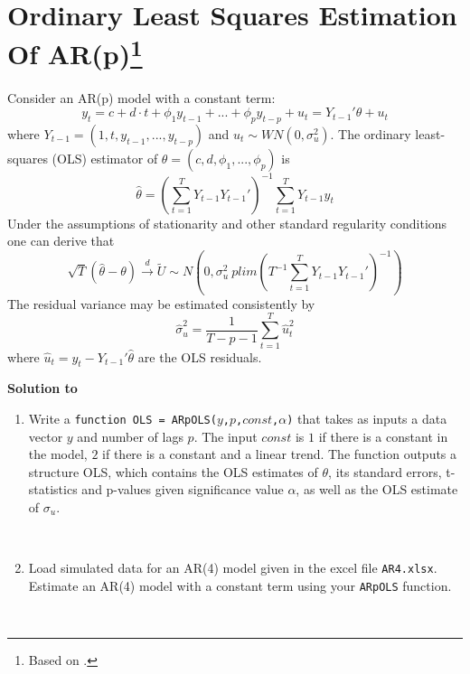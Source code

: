 \documentclass[a4paper]{scrartcl}
\begin{document}
    \section[Ordninary Least Squares Estimation Of AR(p)]{Ordinary Least Squares Estimation Of AR(p)\footnote{Based on \cite{Luetkepohl.2004}.}}\label{ex:OLSARp}
    Consider an AR(p) model with a constant term:
    $$ y_t = c + d\cdot t + \phi_1 y_{t-1} +... + \phi_p y_{t-p} +u_{t}=Y_{t-1}'\theta + u_t$$
    where $Y_{t-1}=(1,t,y_{t-1},...,y_{t-p})$ and $u_t\sim WN(0,\sigma_u^2)$. The ordinary least-squares (OLS) estimator of $\theta = (c,d,\phi_1,...,\phi_p)$ is $$\hat{\theta} = \left(\sum_{t=1}^TY_{t-1}Y_{t-1}'\right)^{-1}\sum_{t=1}^T Y_{t-1} y_t$$ Under the assumptions of stationarity and other standard regularity conditions one can derive that
    $$\sqrt{T}(\hat{\theta}-\theta)\overset{d}{\rightarrow}\tilde{U}\sim N\left(0,\sigma_u^2 ~plim\left(T^{-1}\sum_{t=1}^T Y_{t-1}Y_{t-1}'\right)^{-1} \right)$$
    The residual variance may be estimated consistently by $$\hat{\sigma}_u^2 = \frac{1}{T-p-1}\sum_{t=1}^T\hat{u}_t^2$$ where $\hat{u}_t=y_t -Y_{t-1}'\hat{\theta}$ are the OLS residuals.
    \begin{solution}\textbf{Solution to }\end{solution}
    
    \begin{enumerate}
        \item Write a \texttt{function OLS = ARpOLS($y$,$p$,$const$,$\alpha$)} that takes as inputs a data vector $y$ and number of lags $p$. The input $const$ is $1$ if there is a constant in the model, $2$ if there is a constant and a linear trend. The function outputs a structure OLS, which contains the OLS estimates of $\theta$, its standard errors, t-statistics and p-values given significance value $\alpha$, as well as the OLS estimate of $\sigma_u$.
              \begin{solution}~
                  
              \end{solution}
        \item Load simulated data for an AR(4) model given in the excel file \texttt{AR4.xlsx}. Estimate an AR(4) model with a constant term using your \texttt{ARpOLS} function.
              \begin{solution}~
                  
                  \newpage %
              \end{solution}
              
    \end{enumerate}
    \newpage
    
\end{document}
